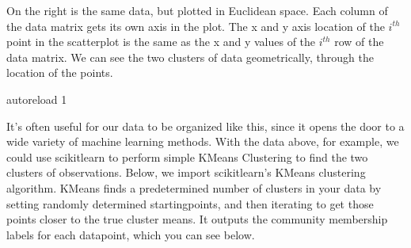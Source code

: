 \documentclass[letterpaper,10pt,english]{jupyterBook}
\begin{document}
\sphinxAtStartPar
On the right is the same data, but plotted in Euclidean space. Each column of the data matrix gets its own axis in the plot. The x and y axis location of the \(i^{th}\) point in the scatterplot is the same as the x and y values of the \(i^{th}\) row of the data matrix. We can see the two clusters of data geometrically, through the location of the points.

\begin{sphinxVerbatim}[commandchars=\\\{\}]
 autoreload
 1

   
   
   

  \PYG{p}{[}\PYG{p}{[} \PYG{p}{]} 
                    \PYG{p}{[} \PYG{p}{]}\PYG{p}{]}
    
                   

   \PYG{p}{[} \PYG{p}{]}
\end{sphinxVerbatim}

\noindent{}

\sphinxAtStartPar
It’s often useful for our data to be organized like this, since it opens the door to a wide variety of machine learning methods. With the data above, for example, we could use scikit\sphinxhyphen{}learn to perform simple K\sphinxhyphen{}Means Clustering to find the two clusters of observations. Below, we import scikit\sphinxhyphen{}learn’s K\sphinxhyphen{}Means clustering algorithm. K\sphinxhyphen{}Means finds a pre\sphinxhyphen{}determined number of clusters in your data by setting randomly determined starting\sphinxhyphen{}points, and then iterating to get those points closer to the true cluster means. It outputs the community membership labels for each datapoint, which you can see below.
\end{document}
